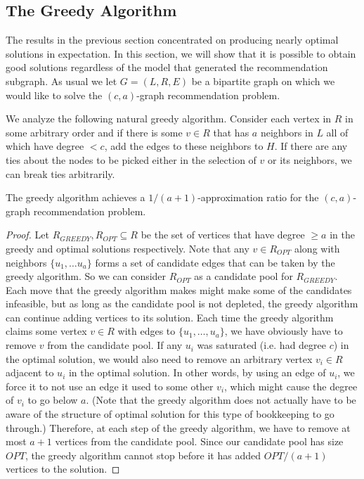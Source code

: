 \subsection{The Greedy Algorithm}
\label{greedy}
The results in the previous section concentrated on producing nearly
optimal solutions in expectation. In this section, we will show that
it is possible to obtain good solutions regardless of the model that
generated the recommendation subgraph. As usual we let $G=(L,R,E)$ be a
bipartite graph on which we would like to solve the $(c,a)$-graph
recommendation problem. \vs

We analyze the following natural greedy algorithm. Consider each vertex
in $R$ in some arbitrary order and if there is some $v \in R$ that has
$a$ neighbors in $L$ all of which have degree $< c$, add the edges to
these neighbors to $H$. If there are any ties about the nodes to be
picked either in the selection of $v$ or its neighbors, we can break
ties arbitrarily. 

\begin{thm}
The greedy algorithm achieves a $1/(a+1)$-approximation ratio for the $(c,a)$-graph
recommendation problem.
\end{thm}
\begin{proof}
Let $R_{GREEDY}, R_{OPT}\subseteq R$ be the set of vertices that have
degree $\geq a$ in the greedy and optimal solutions respectively. Note
that any $v \in R_{OPT}$ along with neighbors $\{u_1,\ldots u_a\}$
forms a set of candidate edges that can be taken by the greedy
algorithm. So we can consider $R_{OPT}$ as a candidate pool for
$R_{GREEDY}$. Each move that the greedy algorithm makes might make
some of the candidates infeasible, but as long as the candidate pool
is not depleted, the greedy algorithm can continue adding vertices to
its solution. Each time the greedy algorithm claims some vertex $v\in
R$ with edges to $\{u_1,\ldots, u_a\}$, we have obviously have to
remove $v$ from the candidate pool. If any $u_i$ was saturated
(i.e. had degree $c$) in the optimal solution, we would also need to
remove an arbitrary vertex $v_i\in R$ adjacent to $u_i$ in the optimal
solution. In other words, by using an edge of $u_i$, we force it to
not use an edge it used to some other $v_i$, which might cause the
degree of $v_i$ to go below $a$. (Note that the greedy algorithm does
not actually have to be aware of the structure of optimal solution for
this type of bookkeeping to go through.) Therefore, at each step of
the greedy algorithm, we have to remove at most $a+1$ vertices from
the candidate pool. Since our candidate pool has size $OPT$, the
greedy algorithm cannot stop before it has added $OPT/(a+1)$
vertices to the solution.
\end{proof}

